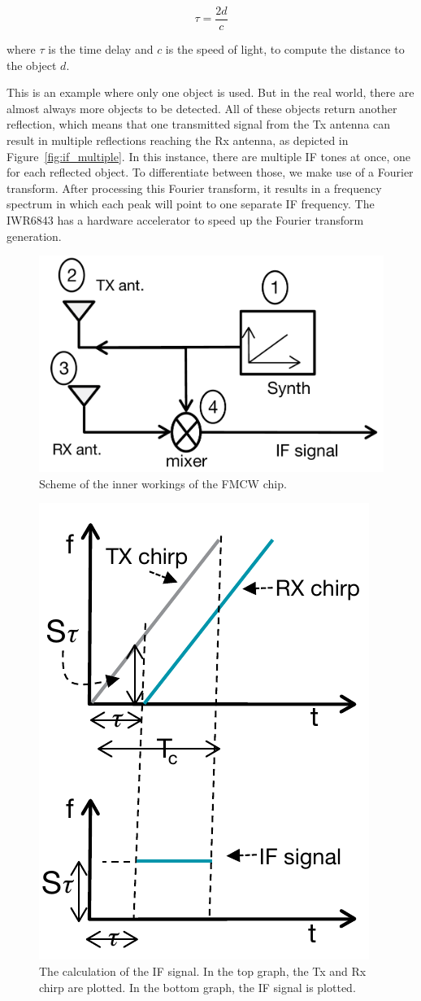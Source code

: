 \begin{equation}
\tau = \frac{2d}{c}
\label{eq:range_equation}
\end{equation}

where $\tau$ is the time delay and $c$ is the speed of light, to compute the distance to the object $d$. 

This is an example where only one object is used. But in the real world, there are almost always more objects to be detected. All of these objects return another reflection, which means that one transmitted signal from the Tx antenna can result in multiple reflections reaching the Rx antenna, as depicted in Figure~\ref{fig:if_multiple}. In this instance, there are multiple IF tones at once, one for each reflected object. To differentiate between those, we make use of a Fourier transform. After processing this Fourier transform, it results in a frequency spectrum in which each peak will point to one separate IF frequency. The IWR6843 has a hardware accelerator to speed up the Fourier transform generation.


\begin{figure}[t]
\centering
\includegraphics[width=.5\textwidth]{figures/fmcw_internals.png}
\caption{Scheme of the inner workings of the FMCW chip.}
\label{fig:fmcw_inner}
\end{figure}

\begin{figure}[t]
\centering
\includegraphics[width=.5\textwidth]{figures/if_signal.png}
\caption{The calculation of the IF signal. In the top graph, the Tx and Rx chirp are plotted. In the bottom graph, the IF signal is plotted.}
\label{fig:if_signal}
\end{figure}

